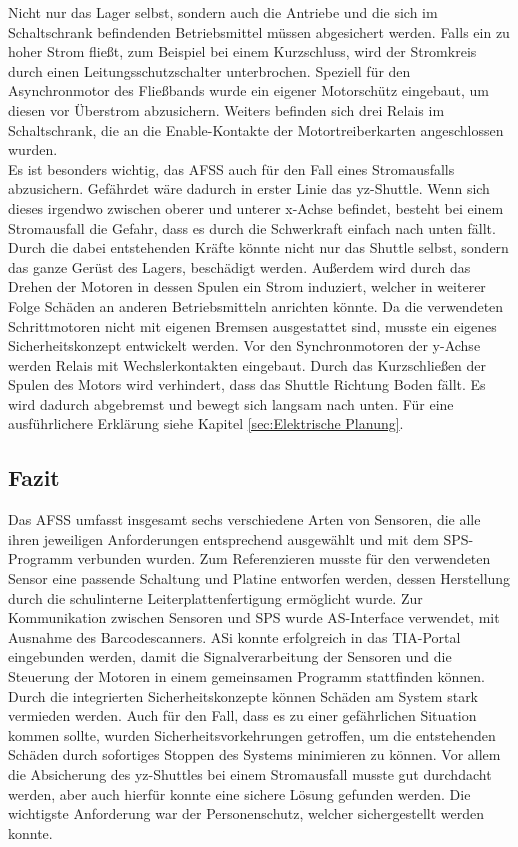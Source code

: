 Nicht nur das Lager selbst, sondern auch die Antriebe und die sich im Schaltschrank befindenden Betriebsmittel müssen abgesichert werden. Falls ein zu hoher Strom fließt, zum Beispiel bei einem Kurzschluss, wird der Stromkreis durch einen Leitungsschutzschalter unterbrochen. Speziell für den Asynchronmotor des Fließbands wurde ein eigener Motorschütz eingebaut, um diesen vor Überstrom abzusichern. Weiters befinden sich drei Relais im Schaltschrank, die an die Enable-Kontakte der Motortreiberkarten angeschlossen wurden.\\
Es ist besonders wichtig, das AFSS auch für den Fall eines Stromausfalls abzusichern. Gefährdet wäre dadurch in erster Linie das yz-Shuttle. Wenn sich dieses irgendwo zwischen oberer und unterer x-Achse befindet, besteht bei einem Stromausfall die Gefahr, dass es durch die Schwerkraft einfach nach unten fällt. Durch die dabei entstehenden Kräfte könnte nicht nur das Shuttle selbst, sondern das ganze Gerüst des Lagers, beschädigt werden. Außerdem wird durch das Drehen der Motoren in dessen Spulen ein Strom induziert, welcher in weiterer Folge Schäden an anderen Betriebsmitteln anrichten könnte. Da die verwendeten Schrittmotoren nicht mit eigenen Bremsen ausgestattet sind, musste ein eigenes Sicherheitskonzept entwickelt werden. Vor den Synchronmotoren der y-Achse werden Relais mit Wechslerkontakten eingebaut. Durch das Kurzschließen der Spulen des Motors wird verhindert, dass das Shuttle Richtung Boden fällt. Es wird dadurch abgebremst und bewegt sich langsam nach unten. Für eine ausführlichere Erklärung siehe Kapitel \ref{sec:Elektrische Planung}.

\subsection{Fazit}
Das AFSS umfasst insgesamt sechs verschiedene Arten von Sensoren, die alle ihren jeweiligen Anforderungen entsprechend ausgewählt und mit dem SPS-Programm verbunden wurden. Zum Referenzieren musste für den verwendeten Sensor eine passende Schaltung und Platine entworfen werden, dessen Herstellung durch die schulinterne Leiterplattenfertigung ermöglicht wurde. Zur Kommunikation zwischen Sensoren und SPS wurde AS-Interface verwendet, mit Ausnahme des Barcodescanners. ASi konnte erfolgreich in das TIA-Portal eingebunden werden, damit die Signalverarbeitung der Sensoren und die Steuerung der Motoren in einem gemeinsamen Programm stattfinden können.\\
Durch die integrierten Sicherheitskonzepte können Schäden am System stark vermieden werden. Auch für den Fall, dass es zu einer gefährlichen Situation kommen sollte, wurden Sicherheitsvorkehrungen getroffen, um die entstehenden Schäden durch sofortiges Stoppen des Systems minimieren zu können. Vor allem die Absicherung des yz-Shuttles bei einem Stromausfall musste gut durchdacht werden, aber auch hierfür konnte eine sichere Lösung gefunden werden. Die wichtigste Anforderung war der Personenschutz, welcher sichergestellt werden konnte.